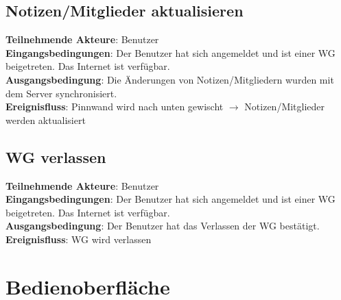 \documentclass[a4paper]{scrreprt}
\begin{document}
        	\subsection{Notizen/Mitglieder aktualisieren}
        	\textbf{Teilnehmende Akteure}: Benutzer \\
        	\textbf{Eingangsbedingungen}: Der Benutzer hat sich angemeldet und ist einer WG beigetreten. Das Internet ist verfügbar. \\
        	\textbf{Ausgangsbedingung}: Die Änderungen von Notizen/Mitgliedern wurden mit dem Server synchronisiert. \\
        	\textbf{Ereignisfluss}: Pinnwand wird nach unten gewischt $\rightarrow$ Notizen/Mitglieder werden aktualisiert
        	
        	\subsection{WG verlassen}
        	\textbf{Teilnehmende Akteure}: Benutzer \\
        	\textbf{Eingangsbedingungen}: Der Benutzer hat sich angemeldet und ist einer WG beigetreten. Das Internet ist verfügbar. \\
        	\textbf{Ausgangsbedingung}: Der Benutzer hat das Verlassen der WG bestätigt. \\
        	\textbf{Ereignisfluss}: WG wird verlassen
        	
        	\newpage
        \section{Bedienoberfläche}
        
\end{document}
